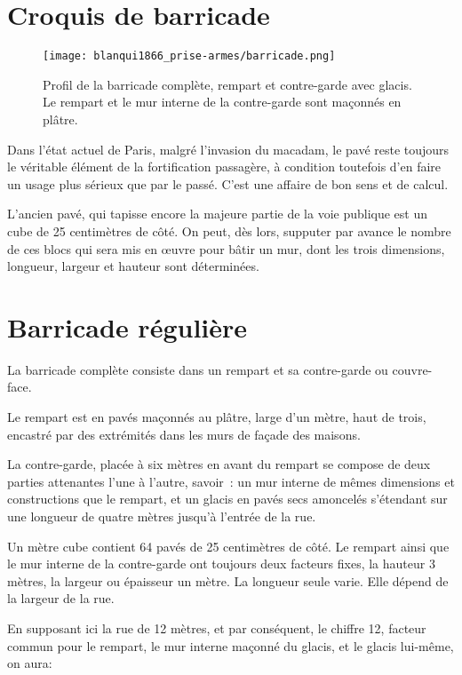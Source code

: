\documentclass[french,twoside]{book} %
\begin{document}
\section[{Croquis de barricade}]{Croquis de barricade}\renewcommand{\leftmark}{Croquis de barricade}


\begin{figure}[h]
  \centering
  \texttt{[image: blanqui1866\_prise-armes/barricade.png]}
\caption{Profil de la barricade complète, rempart et contre-garde avec glacis. Le rempart et le mur interne de la contre-garde sont maçonnés en plâtre.}
\end{figure}

\noindent Dans l’état actuel de Paris, malgré l’invasion du macadam, le pavé reste toujours le véritable élément de la fortification passagère, à condition toutefois d’en faire un usage plus sérieux que par le passé. C'est une affaire de bon sens et de calcul.\par
L'ancien pavé, qui tapisse encore la majeure partie de la voie publique est un cube de 25 centimètres de côté. On peut, dès lors, supputer par avance le nombre de ces blocs qui sera mis en œuvre pour bâtir un mur, dont les trois dimensions, longueur, largeur et hauteur sont déterminées.
\section[{Barricade régulière}]{Barricade régulière}\renewcommand{\leftmark}{Barricade régulière}

\noindent La barricade complète consiste dans un rempart et sa contre-garde ou couvre-face.\par
Le rempart est en pavés maçonnés au plâtre, large d’un mètre, haut de trois, encastré par des extrémités dans les murs de façade des maisons.\par
La contre-garde, placée à six mètres en avant du rempart se compose de deux parties attenantes l’une à l’autre, savoir : un mur interne de mêmes dimensions et constructions que le rempart, et un glacis en pavés secs amoncelés s’étendant sur une longueur de quatre mètres jusqu’à l’entrée de la rue.\par
Un mètre cube contient 64 pavés de 25 centimètres de côté. Le rempart ainsi que le mur interne de la contre-garde ont toujours deux facteurs fixes, la hauteur 3 mètres, la largeur ou épaisseur un mètre. La longueur seule varie. Elle dépend de la largeur de la rue.\par
En supposant ici la rue de 12 mètres, et par conséquent, le chiffre 12, facteur commun pour le rempart, le mur interne maçonné du glacis, et le glacis lui-même, on aura:\par
\end{document}
